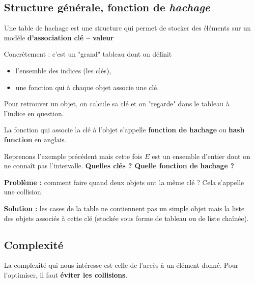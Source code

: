 \documentclass{../cours}
\begin{document}
\subsection{Structure générale, fonction de \emph{hachage}}

\begin{Definition}
Une table de hachage est une structure qui permet de stocker des éléments sur un modèle \textbf{d'association clé -- valeur}
\end{Definition}

Concrètement : c'est un "grand" tableau dont on définit
\begin{itemize}
\item l'ensemble des indices (les clés),
\item une fonction qui à chaque objet associe une clé.
\end{itemize}

Pour retrouver un objet, on calcule sa clé et on "regarde" dans le tableau à l'indice en question.

\begin{Definition}
La fonction qui associe la clé à l'objet s'appelle \textbf{fonction de hachage} ou \textbf{hash function} en anglais.
\end{Definition}

\begin{Example}
Reprenons l'exemple précédent mais cette fois $E$ est un ensemble d'entier dont on ne connaît pas l'intervalle. \textbf{Quelles clés ? Quelle fonction de hachage ?}


\end{Example}

\textbf{Problème : } comment faire quand deux objets ont la même clé ? Cela s'appelle une collision. 

\textbf{Solution : } les cases de la table ne contiennent pas un simple objet mais la liste des objets associés à cette clé (stockée sous forme de tableau ou de liste chaînée).

\subsection{Complexité}

La complexité qui nous intéresse est celle de l'accès à un élément donné. Pour l'optimiser, il faut \textbf{éviter les collisions}.
\end{document}
